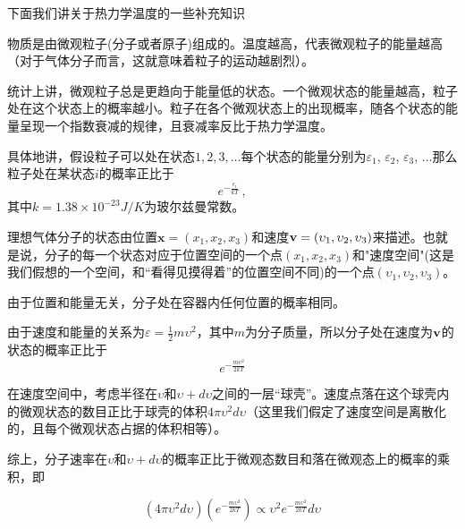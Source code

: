 \documentclass[CJK]{beamer}
\begin{document}
\begin{frame}
\bch
下面我们讲关于热力学温度的一些补充知识
\ech
\end{frame}

\begin{frame}
\bch
\bitem
\item{物质是由微观粒子(分子或者原子)组成的。温度越高，代表微观粒子的能量越高（对于气体分子而言，这就意味着粒子的运动越剧烈）。}
\item{统计上讲，微观粒子总是更趋向于能量低的状态。一个微观状态的能量越高，粒子处在这个状态上的概率越小。粒子在各个微观状态上的出现概率，随各个状态的能量呈现一个指数衰减的规律，且衰减率反比于热力学温度。

具体地讲，假设粒子可以处在状态$1,2,3,\ldots$每个状态的能量分别为$\varepsilon_1$, $\varepsilon_2$, $\varepsilon_3$, $\ldots$那么粒子处在某状态$i$的概率正比于
$$e^{-\frac{\epsilon_i}{k T}}\, ,$$其中$k=1.38\times 10^{-23} J/K$为玻尔兹曼常数。
}
\eitem

\ech
\end{frame}

\begin{frame}
\bch
理想气体分子的状态由位置$\mathbf{x} = (x_1, x_2, x_3)$和速度${\mathbf{v}} = (\upsilon_1, \upsilon_2, \upsilon_3)$来描述。也就是说，分子的每一个状态对应于位置空间的一个点$(x_1, x_2, x_3)$和"速度空间"({\darkblue 这是我们假想的一个空间，和“看得见摸得着”的位置空间不同})的一个点$(\upsilon_1, \upsilon_2, \upsilon_3)$。

\skipline

由于位置和能量无关，分子处在容器内任何位置的概率相同。

\skipline

由于速度和能量的关系为$\varepsilon = \frac{1}{2} m \upsilon^2$，其中$m$为分子质量，所以分子处在速度为${\mathbf{v}}$的状态的概率正比于
$$e^{-\frac{m\upsilon^2}{2kT}}$$


\ech
\end{frame}

\begin{frame}
\bch

在速度空间中，考虑半径在$\upsilon$和$\upsilon+d\upsilon$之间的一层“球壳”。速度点落在这个球壳内的微观状态的数目正比于球壳的体积$4\pi \upsilon^2 d\upsilon$（这里我们假定了速度空间是离散化的，且每个微观状态占据的体积相等）。

综上，分子速率在$\upsilon$和$\upsilon+d\upsilon$的概率正比于微观态数目和落在微观态上的概率的乘积，即

$$(4\pi \upsilon^2 d\upsilon) (e^{-\frac{m\upsilon^2}{2kT}}) \propto  \upsilon^2 e^{-\frac{m\upsilon^2}{2kT}} d\upsilon  $$


\ech
\end{frame}
\end{document}
